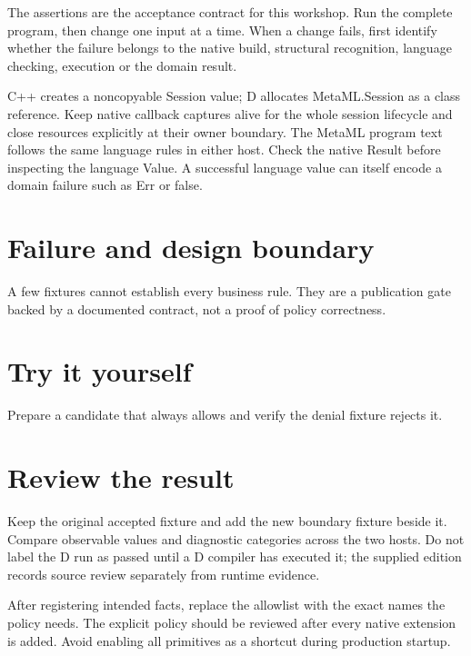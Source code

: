 The assertions are the acceptance contract for this workshop. Run the complete program, then change one input at a time. When a change fails, first identify whether the failure belongs to the native build, structural recognition, language checking, execution or the domain result.

\clearpage
{}
C++ creates a noncopyable Session value; D allocates MetaML.Session as a class reference. Keep native callback captures alive for the whole session lifecycle and close resources explicitly at their owner boundary. The MetaML program text follows the same language rules in either host. Check the native Result before inspecting the language Value. A successful language value can itself encode a domain failure such as Err or false.


\section*{Failure and design boundary}
A few fixtures cannot establish every business rule. They are a publication gate backed by a documented contract, not a proof of policy correctness.

\section*{Try it yourself}
Prepare a candidate that always allows and verify the denial fixture rejects it.

\section*{Review the result}
Keep the original accepted fixture and add the new boundary fixture beside it. Compare observable values and diagnostic categories across the two hosts. Do not label the D run as passed until a D compiler has executed it; the supplied edition records source review separately from runtime evidence.

\clearpage
{}
After registering intended facts, replace the allowlist with the exact names the policy needs. The explicit policy should be reviewed after every native extension is added. Avoid enabling all primitives as a shortcut during production startup.


